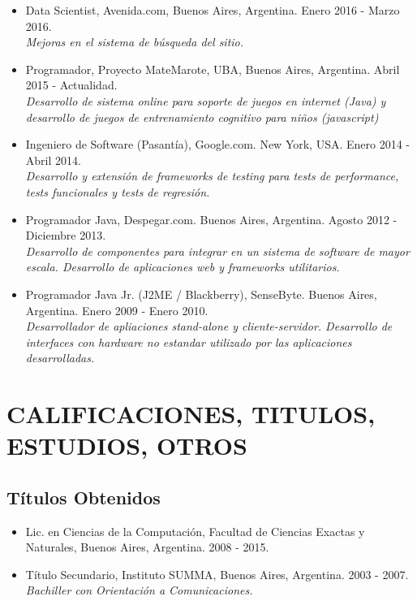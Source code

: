 \documentclass[a4paper,10pt]{article}
\begin{document}
\begin{itemize}
    \item {Data Scientist, Avenida.com, Buenos Aires, Argentina.
            Enero 2016 - Marzo 2016. \\
            {\small \itshape Mejoras en el sistema de búsqueda del sitio.}}

    \item {Programador, Proyecto MateMarote, UBA, Buenos Aires, Argentina.
            Abril 2015 - Actualidad. \\
            {\small \itshape Desarrollo de sistema online para soporte de
        juegos en internet (Java) y desarrollo de juegos de entrenamiento
cognitivo para niños (javascript)}}

    \item {Ingeniero de Software (Pasantía), Google.com. New York, USA. Enero
            2014 - Abril 2014. \\ 
    {\small \itshape Desarrollo y extensión de frameworks de testing para tests
de performance, tests funcionales y tests de regresión.}}

    \item {Programador Java, Despegar.com. Buenos Aires, Argentina. Agosto 2012
           - Diciembre 2013. \\
    {\small \itshape Desarrollo de componentes para integrar en un sistema de
software de mayor escala. Desarrollo de aplicaciones web y frameworks
utilitarios.}}

    \item {Programador Java Jr. (J2ME / Blackberry), SenseByte. Buenos Aires,
            Argentina. Enero 2009 - Enero 2010. \\ 
    {\small \itshape Desarrollador de apliaciones stand-alone y
cliente-servidor.  Desarrollo de interfaces con hardware no estandar utilizado
por las aplicaciones desarrolladas.}}

\end{itemize}

\section{CALIFICACIONES, TITULOS, ESTUDIOS, OTROS}

\subsection{Títulos Obtenidos}

\begin{itemize}
    \item {Lic. en Ciencias de la Computación, Facultad de Ciencias Exactas y
        Naturales, Buenos Aires, Argentina. 2008 - 2015.}
    \item {Título Secundario, Instituto SUMMA, Buenos Aires, Argentina. 2003
            - 2007. \\
        {\small \itshape Bachiller con Orientación a Comunicaciones.}}
\end{itemize}
\end{document}

